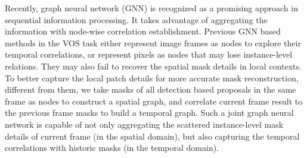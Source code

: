 \documentclass[letterpaper]{article} %
\begin{document}
Recently, graph neural network (GNN) \cite{scarselli2008graph,gilmer2017neural,cheng2020spatio,cheng2020graph,liu2020jointly} is recognized as a promising approach in sequential information processing. It takes advantage of aggregating the information with node-wise correlation establishment.
Previous GNN based methods \cite{wang2019zero,haller2019spacetime,bao2018cnn} in the VOS task either represent image frames as nodes to explore their temporal correlations, or represent pixels as nodes that may lose instance-level relations. They may also fail to recover the spatial mask details in local contexts.
To better capture the local patch details for more accurate mask reconstruction, different from them, we take masks of all detection based proposals in the same frame as nodes to construct a spatial graph, and correlate current frame result to the previous frame masks to build a temporal graph. Such a joint graph neural network is capable of not only aggregating the scattered instance-level mask details of current frame (in the spatial domain), but also capturing the temporal correlations with historic masks (in the temporal domain).
\end{document}
